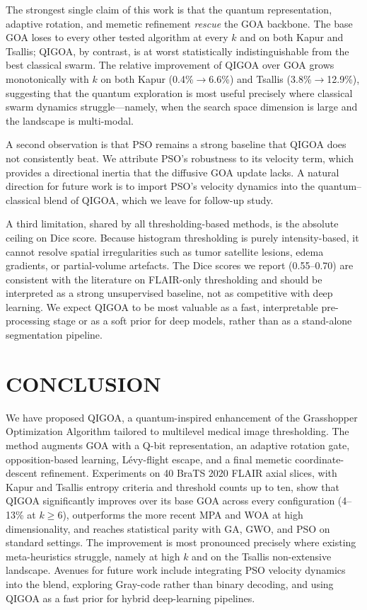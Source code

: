 The strongest single claim of this work is that the quantum representation, adaptive rotation, and memetic refinement \emph{rescue} the GOA backbone. The base GOA loses to every other tested algorithm at every $k$ and on both Kapur and Tsallis; QIGOA, by contrast, is at worst statistically indistinguishable from the best classical swarm. The relative improvement of QIGOA over GOA grows monotonically with $k$ on both Kapur (0.4\%$\to$6.6\%) and Tsallis (3.8\%$\to$12.9\%), suggesting that the quantum exploration is most useful precisely where classical swarm dynamics struggle---namely, when the search space dimension is large and the landscape is multi-modal.

A second observation is that PSO remains a strong baseline that QIGOA does not consistently beat. We attribute PSO's robustness to its velocity term, which provides a directional inertia that the diffusive GOA update lacks. A natural direction for future work is to import PSO's velocity dynamics into the quantum--classical blend of QIGOA, which we leave for follow-up study.

A third limitation, shared by all thresholding-based methods, is the absolute ceiling on Dice score. Because histogram thresholding is purely intensity-based, it cannot resolve spatial irregularities such as tumor satellite lesions, edema gradients, or partial-volume artefacts. The Dice scores we report (0.55--0.70) are consistent with the literature on FLAIR-only thresholding and should be interpreted as a strong unsupervised baseline, not as competitive with deep learning. We expect QIGOA to be most valuable as a fast, interpretable pre-processing stage or as a soft prior for deep models, rather than as a stand-alone segmentation pipeline.

\section{CONCLUSION}\label{sec:conclusion}

We have proposed QIGOA, a quantum-inspired enhancement of the Grasshopper Optimization Algorithm tailored to multilevel medical image thresholding. The method augments GOA with a Q-bit representation, an adaptive rotation gate, opposition-based learning, L\'evy-flight escape, and a final memetic coordinate-descent refinement. Experiments on 40 BraTS 2020 FLAIR axial slices, with Kapur and Tsallis entropy criteria and threshold counts up to ten, show that QIGOA significantly improves over its base GOA across every configuration (4--13\% at $k{\ge}6$), outperforms the more recent MPA and WOA at high dimensionality, and reaches statistical parity with GA, GWO, and PSO on standard settings. The improvement is most pronounced precisely where existing meta-heuristics struggle, namely at high $k$ and on the Tsallis non-extensive landscape. Avenues for future work include integrating PSO velocity dynamics into the blend, exploring Gray-code rather than binary decoding, and using QIGOA as a fast prior for hybrid deep-learning pipelines.

